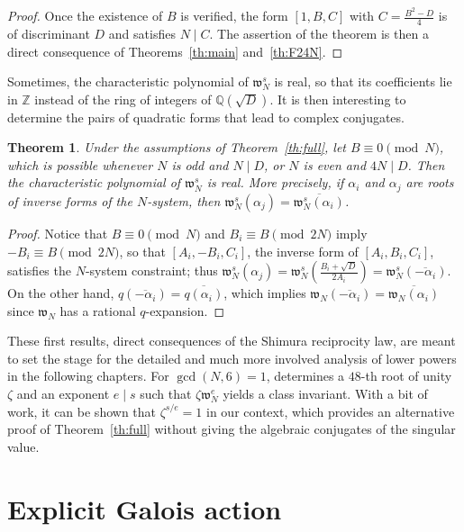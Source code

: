 \documentclass[12pt,twoside,leqno]{article}
\newtheorem{theorem}{Theorem}[section]
\numberwithin{equation}{section}
\newcommand{\w}{\mathfrak w}
\newcommand{\Z}{\mathbb Z}
\newcommand{\Q}{\mathbb Q}
\begin{document}
\begin {proof}
Once the existence of $B$ is verified, the form $[1, B, C]$ with
$C = \frac {B^2 - D}{4}$ is of discriminant $D$ and satisfies $N \mid C$.
The assertion of the theorem is then a direct
consequence of Theorems~\ref {th:main} and~\ref {th:F24N}.
\end {proof}

Sometimes, the characteristic polynomial of $\w_N^s$ is real, so that its
coefficients lie in $\Z$ instead of the ring of integers of $\Q (\sqrt D)$.
It is then interesting to determine the pairs of quadratic forms that lead to
complex conjugates.

\begin {theorem}
\label {th:reality}
Under the assumptions of Theorem~\ref {th:full}, let $B \equiv 0 \pmod N$,
which is possible whenever $N$ is odd and $N \mid D$,
or $N$ is even and $4 N \mid D$. Then the characteristic polynomial of $\w_N^s$
is real. More precisely, if $\alpha_i$ and
$\alpha_j$ are roots of inverse forms of the $N$-system, then
$\w_N^s (\alpha_j) = \overline {\w_N^s (\alpha_i)}$.
\end {theorem}

\begin {proof}
Notice that $B \equiv 0 \pmod N$ and $B_i \equiv B \pmod {2 N}$
imply $-B_i \equiv B \pmod {2 N}$, so that $[A_i, -B_i, C_i]$,
the inverse form of $[A_i, B_i, C_i]$, satisfies the $N$-system
constraint; thus
$
\w_N^s (\alpha_j)
= \w_N^s \left( \frac {B_i + \sqrt {D}}{2 A_i} \right)
= \w_N^s (\overline {- \alpha_i}).
$
On the other hand, $q (\overline {- \alpha_i}) = \overline {q (\alpha_i)}$,
which implies $\w_N (\overline {-\alpha_i}) = \overline {\w_N (\alpha_i)}$
since $\w_N$ has a rational $q$-expansion.
\end {proof}

These first results, direct consequences of the Shimura reciprocity law, are
meant to set the stage for the detailed and much more involved analysis of
lower powers in the following chapters.
For $\gcd (N, 6) = 1$, \cite [Theorem~20]{HaVi97} determines a
$48$-th root of unity~$\zeta$ and an exponent $e \mid s$
such that $\zeta \w_N^e$ yields a class invariant. With a bit of work,
it can be shown that $\zeta^{s / e} = 1$ in our context, which provides
an alternative proof of Theorem~\ref {th:full} without giving the algebraic
conjugates of the singular value.



\section{Explicit Galois action}
\label{sct:lowerbis}
\end{document}
